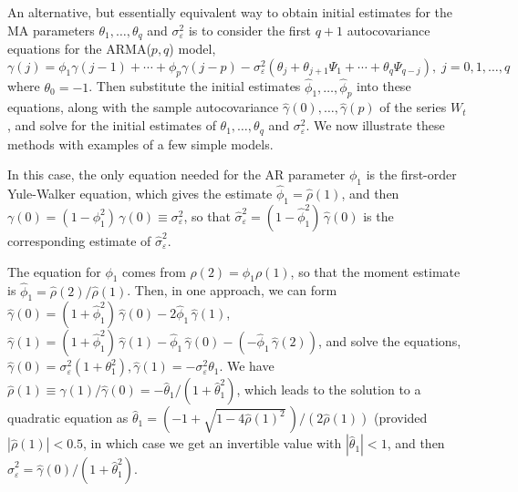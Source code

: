 An alternative, but essentially equivalent way to obtain initial estimates for the MA parameters $\theta_1,\ldots, \theta_q$ and $\sigma_{\varepsilon}^2$ is to consider the first $q+1$ autocovariance equations for the ARMA($p,q$) model,
	\[
	\gamma(j) = \phi_1 \gamma(j-1) + \cdots + \phi_p \gamma(j-p) - \sigma_{\varepsilon}^2 ( \theta_j + \theta_{j+1} \Psi_1 + \cdots + \theta_q \Psi_{q-j} ), \; j = 0,1,\ldots,q
	\]
where $\theta_0 = -1$. Then substitute the initial estimates $\hat{\phi}_1,\ldots,\hat{\phi}_p$ into these equations, along with the sample autocovariance $\hat{\gamma}(0),\ldots,\hat{\gamma}(p)$ of the series $W_t$, and solve for the initial estimates of $\theta_1,\ldots,\theta_q$ and $\sigma_{\varepsilon}^2$. We now illustrate these methods with examples of a few simple models. 


\begin{ex}[AR(1) Model]
 In this case, the only equation needed for the AR parameter $\phi_1$ is the first-order Yule-Walker equation, which gives the estimate $\hat{\phi}_1 = \hat{\rho}(1)$, and then $\gamma(0) = (1- \phi_1^2)\,\gamma(0) \equiv \sigma_{\varepsilon}^2$, so that $\hat{\sigma}_{\varepsilon}^2 = (1 - \hat{\phi}_1^2)\,\hat{\gamma}(0)$ is the corresponding estimate of $\hat{\sigma}_{\varepsilon}^2$.
 \end{ex}


\begin{ex}
 The equation for $\phi_1$ comes from $\rho(2) = \phi_1 \rho(1)$, so that the moment estimate is $\hat{\phi}_1 = \hat{\rho}(2) / \hat{\rho}(1)$. Then, in one approach, we can form $\hat{\gamma}(0) = (1+\hat{\phi}_1^2)\,\hat{\gamma}(0) - 2\hat{\phi}_1\,\hat{\gamma}(1)$, $\hat{\gamma}(1) = (1+\hat{\phi}_1^2)\,\hat{\gamma}(1) - \hat{\phi}_1\,\hat{\gamma}(0) - (- \hat{\phi}_1\,\hat{\gamma}(2))$, and solve the equations, $\hat{\gamma}(0) = \sigma_{\varepsilon}^2(1 + \theta_1^2), \hat{\gamma}(1) = -\sigma_{\varepsilon}^2\theta_1$. We have $\hat{\rho}(1) \equiv \hat{\gamma}(1)/\hat{\gamma}(0) = -\hat{\theta}_1/(1 + \hat{\theta}_1^2)$, which leads to the solution to a quadratic equation as $\hat{\theta}_1 = (-1 + \sqrt{1-4\hat{\rho}(1)^2}\,) / (2\hat{\rho}(1))$ (provided $|\hat{\rho}(1)| < 0.5$, in which case we get an invertible value with $|\hat{\theta}_1| < 1$, and then $\hat{\sigma}_{\varepsilon}^2 = \hat{\gamma}(0)/(1+\hat{\theta}_1^2)$.
 \end{ex}


